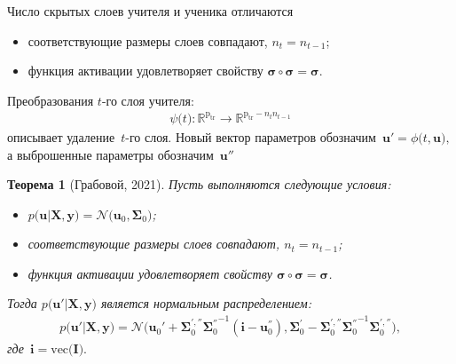 \documentclass[10pt,pdf,hyperref={unicode}]{beamer}
\newtheorem{rustheorem}{Теорема}
\begin{document}
\begin{frame}{Число скрытых слоев учителя и ученика отличаются}
\begin{itemize}
    \item соответствующие размеры слоев совпадают, $n_t=n_{t-1}$;
    \item функция активации удовлетворяет свойству $\bm{\sigma} \circ \bm{\sigma} = \bm{\sigma}$.
\end{itemize}
Преобразования $t$-го слоя учителя:
\[
\begin{aligned}
\psi\bigr(t\bigr) : \mathbb{R}^{\text{p}_{\text{tr}}} \to \mathbb{R}^{\text{p}_{\text{tr}}-n_tn_{t-1}}
\end{aligned}
\]
описывает удаление~$t$-го слоя. Новый вектор параметров обозначим~$\mathbf{u}' =  \phi\bigr(t, \mathbf{u}\bigr),$ а выброшенные параметры обозначим~$\mathbf{u}''$

\begin{rustheorem}[Грабовой, 2021]
Пусть выполняются следующие условия:
\begin{itemize}
\item $p\bigr(\mathbf{u}|\mathbf{X}, \mathbf{y}\bigr) = \mathcal{N}\bigr(\mathbf{u}_0, \bm{\Sigma}_0\bigr)$;
\item соответствующие размеры слоев совпадают, $n_t=n_{t-1}$;
\item функция активации удовлетворяет свойству $\bm{\sigma} \circ \bm{\sigma} = \bm{\sigma}$.
\end{itemize}
Тогда $p\bigr(\mathbf{u}'|\mathbf{X}, \mathbf{y}\bigr)$ является нормальным распределением:
\[
\begin{aligned}
p\bigr(\mathbf{u}'|\mathbf{X}, \mathbf{y}\bigr) = \mathcal{N}\bigr(\mathbf{u}_{0}'+\bm{\Sigma}_0^{', ''}{\bm{\Sigma}_0^{''}}^{-1}\left(\mathbf{i} - \mathbf{u}_0^{''}\right), \bm{\Sigma}_0^{'}-\bm{\Sigma}_0^{', ''}{\bm{\Sigma}_0^{''}}^{-1}\bm{\Sigma}_0^{', ''}\bigr),
\end{aligned}
\]
где~$\mathbf{i} = \mathrm{vec}\bigr(\mathbf{I}\bigr).$
\end{rustheorem}

\end{frame}
\end{document}
